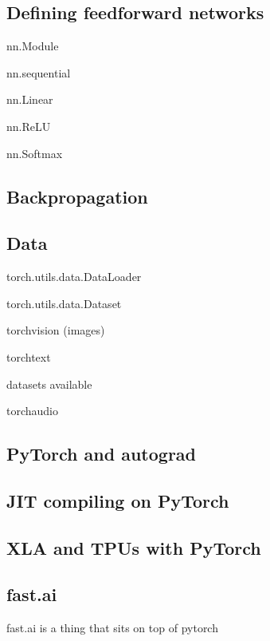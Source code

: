 
\subsection{Defining feedforward networks}



nn.Module

nn.sequential


nn.Linear

nn.ReLU

nn.Softmax

\subsection{Backpropagation}

\subsection{Data}



torch.utils.data.DataLoader

torch.utils.data.Dataset


torchvision (images)

torchtext

datasets available

torchaudio






\subsection{PyTorch and autograd}

\subsection{JIT compiling on PyTorch}

\subsection{XLA and TPUs with PyTorch}

\subsection{fast.ai}
fast.ai is a thing that sits on top of pytorch
